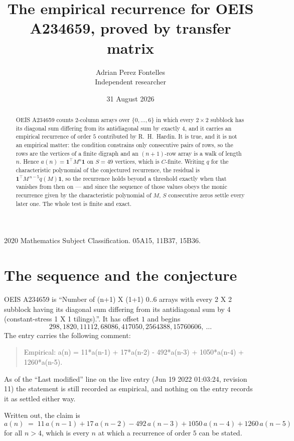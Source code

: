 \documentclass[11pt,a4paper]{article}
\title{The empirical recurrence for OEIS A234659, proved by transfer matrix}
\author{Adrian Perez Fontelles\\ \small Independent researcher}
\date{31 August 2026}
\theoremstyle{plain}
\theoremstyle{definition}
\begin{document}
\maketitle

\begin{abstract}
OEIS A234659 counts $2$-column arrays over $\{0,\dots,6\}$ in which every
$2\times2$ subblock has its diagonal sum differing from its antidiagonal sum by
exactly $4$, and it
carries an empirical recurrence of order $5$ contributed by R.~H.~Hardin. It is true,
and it is not an empirical matter: the condition constrains only consecutive pairs of rows,
so the rows are the vertices of a finite digraph and an $(n+1)$-row array is a walk of
length $n$. Hence $a(n)=\mathbf{1}^{\!\top}M^{n}\mathbf{1}$ on $S=49$ vertices, which
is $C$-finite. Writing $q$ for the characteristic polynomial of the conjectured recurrence,
the residual is $\mathbf{1}^{\!\top}M^{\,n-5}q(M)\mathbf{1}$, so the recurrence
holds beyond a threshold exactly when that vanishes from then on --- and since the sequence
of those values obeys the monic recurrence given by the characteristic polynomial of $M$,
$S$ consecutive zeros settle every later one. The whole test is finite and exact.
\end{abstract}

\noindent\small 2020 Mathematics Subject Classification. 05A15, 11B37, 15B36.\normalsize

\section{The sequence and the conjecture}

OEIS A234659 is ``Number of (n+1) X (1+1) 0..6 arrays with every 2 X 2 subblock having its diagonal sum differing from its antidiagonal sum by 4 (constant-stress 1 X 1 tilings).''. It has offset
$1$ and begins
\[
298, 1820, 11112, 68086, 417050, 2564388, 15760606,\ \dots
\]
The entry carries the following comment:
\begin{quote}\small
Empirical: a(n) = 11*a(n-1) + 17*a(n-2) - 492*a(n-3) + 1050*a(n-4) + 1260*a(n-5).
\end{quote}
As of the ``Last modified'' line on the live entry (Jun 19 2022 01:03:24, revision 11) the statement is
still recorded as empirical, and nothing on the entry records it as settled either way.

Written out, the claim is
\begin{equation}\label{eq:conj}
a(n)\;=\;11\,a(n-1) + 17\,a(n-2) - 492\,a(n-3) + 1050\,a(n-4) + 1260\,a(n-5)
\end{equation}
for all $n>4$, which is every $n$ at which a recurrence of order $5$ can be
stated.
\end{document}
